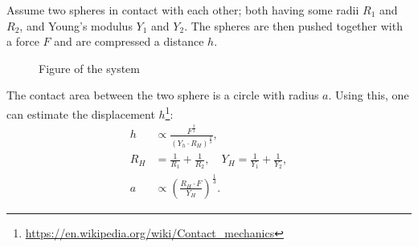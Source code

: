 \documentclass[a4paper]{article}
\begin{document}
\vspace{0.5cm}\noindent
Assume two spheres in contact with each other; both having some radii $R_1$ and $R_2$, and Young's modulus $Y_1$ and $Y_2$. The spheres are then pushed together with a force $F$ and are compressed a distance $h$.
\begin{figure}[H]
    \centering
    \caption{Figure of the system}
    \label{fig: hertzian spheres}
\end{figure}\noindent The contact area between the two sphere is a circle with radius $a$. Using this, one can estimate the displacement $h$\footnote{\url{https://en.wikipedia.org/wiki/Contact_mechanics}}:
\begin{align*}
    h&\propto \frac{F^{\frac{2}{3}}}{\left(Y_h\cdot R_H\right)^{\frac{2}{3}}},\\
    R_H &= \frac{1}{R_1} + \frac{1}{R_2}, \quad Y_H = \frac{1}{Y_1} + \frac{1}{Y_2},\\
    a&\propto \left(\frac{R_H\cdot F}{Y_H}\right)^{\frac{1}{3}}.
\end{align*}
\end{document}
